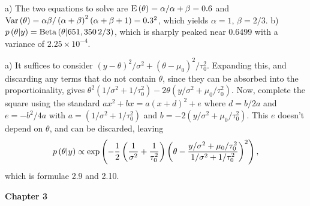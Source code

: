 \vskip 0.2in
 \hfil\break
a) The two equations to solve are ${\rm E} \left(\theta\right) = \alpha / \alpha + \beta = 0.6$
and ${\rm Var} \left(\theta\right) = \alpha \beta / \left(\alpha + \beta\right)^2 \left(\alpha + \beta + 1\right)
= 0.3^2$, which yields $\alpha = 1$, $\beta = 2/3$.\hfil\break
b) $p\left( \theta | y \right) = {\rm Beta}\left(\theta | 651, 350\,2/3\right)$, which
  is sharply peaked near 0.6499 with a variance of $2.25 \times 10^{-4}$.

\vskip 0.2in
 \hfil \break
a) It suffices to consider $\left(y - \theta\right)^2/\sigma^2 + \left(\theta - \mu_0\right)^2/\tau_0^2$.
Expanding this, and discarding any terms that do not contain $\theta$, since they can be
absorbed into the proportioinality, gives $\theta^2 \left(1/\sigma^2 + 1/\tau_0^2\right) -
2 \theta \left(y / \sigma^2 + \mu_0 / \tau_0^2\right)$.  Now, complete the square
using the standard $a x^2 + b x = a\left(x + d\right)^2 + e$ where $d = b/2a$ and
$e = -b^2 / 4a$ with $a = \left(1 / \sigma^2 + 1 / \tau_0^2\right)$ and 
$b = -2 \left(y / \sigma^2 + \mu_0 / \tau_0^2\right)$.  This $e$ doesn't depend on $\theta$,
and can be discarded, leaving
$$
 p\left(\theta | y\right) \propto \exp \left(-{1 \over 2} \left({1 \over \sigma^2} + {1 \over \tau_0^2}
 \right) \left(\theta - {y / \sigma^2 + \mu_0 / \tau_0^2 \over 1 / \sigma^2 + 1 / \tau_0^2}
 \right)^2\right),
$$
which is formulae 2.9 and 2.10.

\vskip 0.5in
\noindent
{\bf \bigger Chapter 3}
\vskip 0.2in

